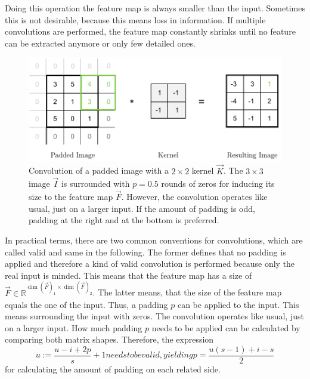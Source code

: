 Doing this operation the feature map is always smaller than the input.
Sometimes this is not desirable, because this means loss in information.
If multiple convolutions are performed, the feature map constantly shrinks until no feature can be extracted anymore or only few detailed ones.
\begin{figure}
	\centering
	\includegraphics{images/convolution_padding.pdf}
	\caption[Convolution of a padded image with a kernel]{Convolution of a padded image with a $2 \times 2$ kernel $\vec{K}$. The $3 \times 3$ image $\vec{I}$ is surrounded with $p=0.5$ rounds of zeros for inducing its size to the feature map $\vec{F}$. However, the convolution operates like usual, just on a larger input. If the amount of padding is odd, padding at the right and at the bottom is preferred.}
	\label{fig:convolution-padding}
\end{figure}
In practical terms, there are two common conventions for convolutions, which are called valid and same in the following.
The former defines that no padding is applied and therefore a kind of valid convolution is performed because only the real input is minded.
This means that the feature map has a size of $\vec{F} \in \mathbb{R}^{\dim(\vec{F})_1 \times \dim(\vec{F})_2}$.
The latter means, that the size of the feature map equals the one of the input.
Thus, a padding $p$ can be applied to the input.
This means surrounding the input with zeros.
The convolution operates like usual, just on a larger input.
How much padding $p$ needs to be applied can be calculated by comparing both matrix shapes.
Therefore, the expression
\begin{subequations}
	\begin{equation}
		u := \frac{u-i+2p}{s}+1
	\end{equation}
needs to be valid, yielding
\begin{equation}
	p = \frac{u(s-1)+i-s}{2}
\end{equation}
\end{subequations}
for calculating the amount of padding on each related side.
